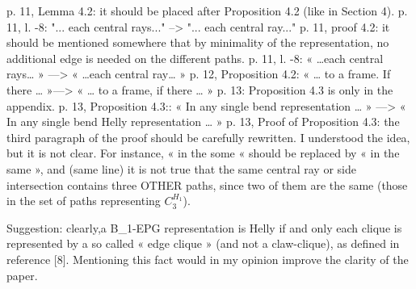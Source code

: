 p. 11, Lemma 4.2: it should be placed after Proposition 4.2 (like in Section 4).
p. 11, l. -8: "... each central rays..." --> "... each central ray..."
p. 11, proof 4.2: it should be mentioned somewhere that by minimality of the representation, no additional edge is needed on the different paths.
p. 11, l. -8: « …each central rays… » —> « …each central ray… »
p. 12, Proposition 4.2: « … to a frame. If there … »—> « … to a frame, if there … »
p. 13: Proposition 4.3 is only in the appendix.
p. 13, Proposition 4.3:: « In any single bend representation … » —> « In any single bend Helly representation … » 
p. 13, Proof of Proposition 4.3: the third paragraph of the proof should be carefully rewritten. I understood the idea, but it is not clear. For instance, « in the some « should be replaced  by « in the same », and (same line) it is not true that the same central ray or side intersection contains three OTHER paths, since two of them are the same (those in the set of paths representing $C_3^{H_1}$).

Suggestion: clearly,a B_1-EPG representation is Helly if and only each clique is represented by a so called « edge clique » (and not a claw-clique), as defined in reference [8]. Mentioning this fact would in my opinion improve the clarity of the paper.


